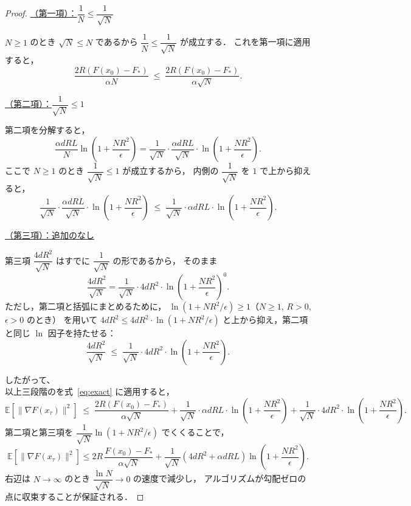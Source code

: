 \documentclass[dvipdfmx,a4paper,11pt]{jsarticle}
\begin{document}
\begin{proof}
\medskip
\noindent
\underline{（第一項）：$\dfrac{1}{N} \leq \dfrac{1}{\sqrt{N}}$}

$N \geq 1$ のとき $\sqrt{N} \leq N$ であるから $\dfrac{1}{N} \leq \dfrac{1}{\sqrt{N}}$ が成立する．
これを第一項に適用すると，
\[
    \frac{2R(F(x_0)-F_*)}{\alpha N}
    \;\leq\;
    \frac{2R(F(x_0)-F_*)}{\alpha\sqrt{N}}.
\]

\medskip
\noindent
\underline{ （第二項）：$\dfrac{1}{\sqrt{N}} \leq 1$}

第二項を分解すると，
\[
    \frac{\alpha dRL}{N}\ln\!\left(1+\frac{NR^2}{\epsilon}\right)
    = \frac{1}{\sqrt{N}} \cdot \frac{\alpha dRL}{\sqrt{N}} \cdot
      \ln\!\left(1+\frac{NR^2}{\epsilon}\right).
\]
ここで $N \geq 1$ のとき $\dfrac{1}{\sqrt{N}} \leq 1$ が成立するから，
内側の $\dfrac{1}{\sqrt{N}}$ を $1$ で上から抑えると，
\[
    \frac{1}{\sqrt{N}} \cdot \frac{\alpha dRL}{\sqrt{N}} \cdot
      \ln\!\left(1+\frac{NR^2}{\epsilon}\right)
    \;\leq\;
    \frac{1}{\sqrt{N}} \cdot \alpha dRL \cdot
      \ln\!\left(1+\frac{NR^2}{\epsilon}\right).
\]

\medskip
\noindent
\underline{ （第三項）：追加のなし}

第三項 $\dfrac{4dR^2}{\sqrt{N}}$ はすでに $\dfrac{1}{\sqrt{N}}$ の形であるから，
そのまま
\[
    \frac{4dR^2}{\sqrt{N}}
    = \frac{1}{\sqrt{N}} \cdot 4dR^2 \cdot
      \ln\!\left(1+\frac{NR^2}{\epsilon}\right)^0.
\]
ただし，第二項と括弧にまとめるために，
$\ln\!\left(1+NR^2/\epsilon\right) \geq 1$（$N \geq 1$, $R > 0$, $\epsilon > 0$ のとき）
を用いて $4dR^2 \leq 4dR^2 \cdot \ln\!\left(1+NR^2/\epsilon\right)$
と上から抑え，第二項と同じ $\ln$ 因子を持たせる：
\[
    \frac{4dR^2}{\sqrt{N}}
    \;\leq\;
    \frac{1}{\sqrt{N}} \cdot 4dR^2 \cdot
      \ln\!\left(1+\frac{NR^2}{\epsilon}\right).
\]

\medskip
\noindent
したがって、\\
\noindent
以上三段階のを式~\eqref{eq:exact} に適用すると，
\[
    \mathbb{E}\!\left[\|\nabla F(x_\tau)\|^2\right]
    \;\leq\;
    \frac{2R(F(x_0)-F_*)}{\alpha\sqrt{N}}
    + \frac{1}{\sqrt{N}} \cdot \alpha dRL \cdot \ln\!\left(1+\frac{NR^2}{\epsilon}\right)
    + \frac{1}{\sqrt{N}} \cdot 4dR^2 \cdot \ln\!\left(1+\frac{NR^2}{\epsilon}\right).
\]
第二項と第三項を $\dfrac{1}{\sqrt{N}}\ln\!\left(1+NR^2/\epsilon\right)$ でくくることで，
\[
    \mathbb{E}\!\left[\|\nabla F(x_\tau)\|^2\right]
    \leq 2R\,\frac{F(x_0)-F_*}{\alpha\sqrt{N}}
    + \frac{1}{\sqrt{N}}\!\left(4dR^2 + \alpha dRL\right)
    \ln\!\left(1+\frac{NR^2}{\epsilon}\right).
    \tag{10}
\]
右辺は $N\to\infty$ のとき $\dfrac{\ln N}{\sqrt{N}}\to 0$ の速度で減少し，
アルゴリズムが勾配ゼロの点に収束することが保証される．
\end{proof}
\end{document}
